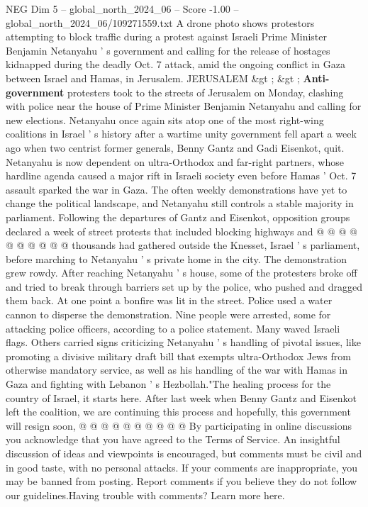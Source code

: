 \begin{textsample}{NEG Dim 5 – global\_north\_2024\_06 – Score -1.00 – global\_north\_2024\_06/109271559.txt}  \label{ex:f5_neg_133}
A drone photo shows protestors attempting to block traffic during a protest against Israeli Prime Minister Benjamin Netanyahu ' s government and calling for the release of hostages kidnapped during the deadly Oct. 7 attack, amid the ongoing conflict in Gaza between Israel and Hamas, in Jerusalem.
JERUSALEM \&gt ; \&gt ; \textbf{Anti-government} protesters took to the streets of Jerusalem on Monday, clashing with police near the house of Prime Minister Benjamin Netanyahu and calling for new elections.
Netanyahu once again sits atop one of the most right-wing coalitions in Israel ' s history after a wartime unity government fell apart a week ago when two centrist former generals, Benny Gantz and Gadi Eisenkot, quit.
Netanyahu is now dependent on ultra-Orthodox and far-right partners, whose hardline agenda caused a major rift in Israeli society even before Hamas ' Oct. 7 assault sparked the war in Gaza.
The often weekly demonstrations have yet to change the political landscape, and Netanyahu still controls a stable majority in parliament.
Following the departures of Gantz and Eisenkot, opposition groups declared a week of street protests that included blocking highways and @ @ @ @ @ @ @ @ @ @ thousands had gathered outside the Knesset, Israel ' s parliament, before marching to Netanyahu ' s private home in the city.
The demonstration grew rowdy.
After reaching Netanyahu ' s house, some of the protesters broke off and tried to break through barriers set up by the police, who pushed and dragged them back.
At one point a bonfire was lit in the street.
Police used a water cannon to disperse the demonstration.
Nine people were arrested, some for attacking police officers, according to a police statement.
Many waved Israeli flags.
Others carried signs criticizing Netanyahu ' s handling of pivotal issues, like promoting a divisive military draft bill that exempts ultra-Orthodox Jews from otherwise mandatory service, as well as his handling of the war with Hamas in Gaza and fighting with Lebanon ' s Hezbollah."The healing process for the country of Israel, it starts here.
After last week when Benny Gantz and Eisenkot left the coalition, we are continuing this process and hopefully, this government will resign soon, @ @ @ @ @ @ @ @ @ @ By participating in online discussions you acknowledge that you have agreed to the Terms of Service.
An insightful discussion of ideas and viewpoints is encouraged, but comments must be civil and in good taste, with no personal attacks.
If your comments are inappropriate, you may be banned from posting.
Report comments if you believe they do not follow our guidelines.Having trouble with comments?
Learn more here.

\end{textsample}
